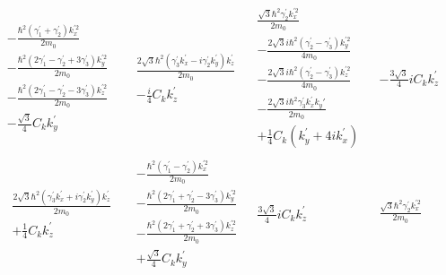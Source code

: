 \begin{align*}
 \begin{array}{c|c|c|c}
\begin{array}{c}
-\frac{\hbar^2(\gamma_1^{'} +\gamma_2^{'})k_x^{'2}}{2m_0}\\
-\frac{\hbar^2(2\gamma_1^{'}-\gamma_2^{'}+3\gamma_3^{'})k_y^{'2}}{2m_0}\\
-\frac{\hbar^2(2\gamma_1^{'}-\gamma_2^{'}-3\gamma_3^{'})k_z^{'2}}{2m_0}\\
-\frac{\sqrt{3}}{4}C_kk_y^{'}
\end{array}
&\begin{array}{c}
 \frac{2\sqrt{3}\hbar^2(\gamma_3^{'}k_x^{'} -i\gamma_2^{'}k_y^{'})k_z^{'}}{2m_0} \\
-\frac{i}{4}C_kk_z^{'}
\end{array}
&\begin{array}{c}
\frac{\sqrt{3}\hbar^2\gamma_2^{'}k_x^{'2}}{2m_0} \\
-\frac{2\sqrt{3}i\hbar^2(\gamma_2^{'}-\gamma_3^{'})k_y^{'2}}{4m_0}\\
-\frac{2\sqrt{3}i\hbar^2(\gamma_2^{'}-\gamma_3^{'})k_z^{'2}}{4m_0}\\
-\frac{2\sqrt{3}i\hbar^2\gamma_3^{'}k_x^{'}k_y{'}}{2m_0}\\
+\frac{1}{4} C_k(k_y^{'} + 4ik_x^{'})
\end{array}
&\begin{array}{c}
-\frac{3\sqrt{3}}{4}iC_kk_z^{'}
\end{array}
\\ \hline %
\begin{array}{c}
\begin{array}{c}
 \frac{2\sqrt{3}\hbar^2(\gamma_3^{'}k_x^{'} +i\gamma_2^{'}k_y^{'})k_z^{'}}{2m_0} \\
+\frac{1}{4}C_kk_z^{'}
\end{array}
\end{array}
&\begin{array}{c}
 -\frac{\hbar^2(\gamma_1^{'}-\gamma_2^{'})k_x^{'2}}{2m_0}\\
-\frac{\hbar^2(2\gamma_1^{'}+\gamma_2^{'}-3\gamma_3^{'})k_y^{'2}}{2m_0}\\
-\frac{\hbar^2(2\gamma_1^{'}+\gamma_2^{'}+3\gamma_3^{'})k_z^{'2}}{2m_0}\\
+\frac{\sqrt{3}}{4}C_kk_y^{'}
\end{array}
&\begin{array}{c}
\frac{3\sqrt{3}}{4}iC_kk_z^{'}
\end{array}
&\begin{array}{c}
\frac{\sqrt{3}\hbar^2\gamma_2^{'}k_x^{'2}}{2m_0} \\

\end{array}
\end{array}
\end{align*}
